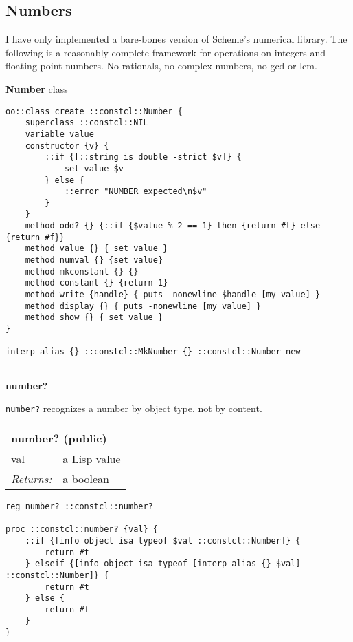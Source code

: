 \documentclass{report}
\begin{document}
\subsection{Numbers}
\label{numbers}

I have only implemented a bare-bones version of Scheme's numerical library. The following is a reasonably complete framework for operations on integers and floating-point numbers. No rationals, no complex numbers, no gcd or lcm.


\textbf{Number} class

\noindent\makebox[\linewidth]{\rule{\linewidth}{0.4pt}}
\begin{lstlisting}
oo::class create ::constcl::Number {
    superclass ::constcl::NIL
    variable value
    constructor {v} {
        ::if {[::string is double -strict $v]} {
            set value $v
        } else {
            ::error "NUMBER expected\n$v"
        }
    }
    method odd? {} {::if {$value % 2 == 1} then {return #t} else {return #f}}
    method value {} { set value }
    method numval {} {set value}
    method mkconstant {} {}
    method constant {} {return 1}
    method write {handle} { puts -nonewline $handle [my value] }
    method display {} { puts -nonewline [my value] }
    method show {} { set value }
}
 
interp alias {} ::constcl::MkNumber {} ::constcl::Number new
 
\end{lstlisting}
\noindent\makebox[\linewidth]{\rule{\linewidth}{0.4pt}}

\textbf{number?}


\texttt{number?} recognizes a number by object type, not by content.

\begin{tabular}{ |l l| }
\hline
\multicolumn{2}{|l|}{number? (public)} \\
\hline
val & a Lisp value \\
\textit{Returns:} & a boolean \\
\hline
\end{tabular}

\noindent\makebox[\linewidth]{\rule{\linewidth}{0.4pt}}
\begin{lstlisting}
reg number? ::constcl::number?
 
proc ::constcl::number? {val} {
    ::if {[info object isa typeof $val ::constcl::Number]} {
        return #t
    } elseif {[info object isa typeof [interp alias {} $val] ::constcl::Number]} {
        return #t
    } else {
        return #f
    }
}
\end{lstlisting}
\noindent\makebox[\linewidth]{\rule{\linewidth}{0.4pt}}
\end{document}
